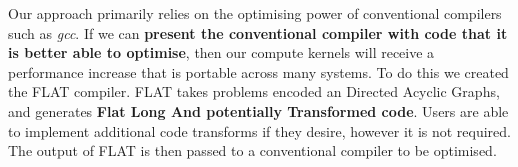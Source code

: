 Our approach primarily relies on the optimising power of conventional compilers such as \textit{gcc}.
If we can \textbf{present the conventional compiler with code that it is better able to optimise}, then our compute kernels will receive a performance increase that is portable across many systems. 
To do this we created the FLAT compiler.
FLAT takes problems encoded an Directed Acyclic Graphs, and generates \textbf{Flat Long And potentially Transformed code}.
Users are able to implement additional code transforms if they desire, however it is not required.
The output of FLAT is then passed to a conventional compiler to be optimised.
